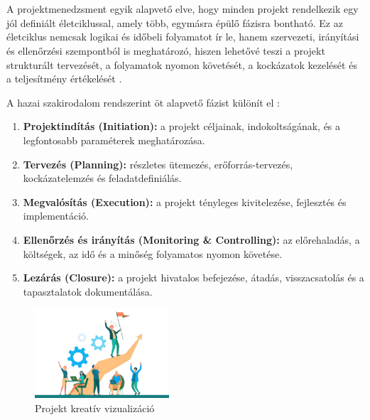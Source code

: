 \chapter{\projectlifecycle}

A projektmenedzsment egyik alapvető elve, hogy minden projekt rendelkezik egy jól definiált életciklussal, 
amely több, egymásra épülő fázisra bontható. 
Ez az életciklus nemcsak logikai és időbeli folyamatot ír le, hanem szervezeti, irányítási és ellenőrzési szempontból is meghatározó, 
hiszen lehetővé teszi a projekt strukturált tervezését, a folyamatok nyomon követését, a kockázatok kezelését és a teljesítmény értékelését \cite{Szalay2018,Hajdu2014,Kaposi2019}. 

A hazai szakirodalom rendszerint öt alapvető fázist különít el \cite{Kovacs2016,Simon2015}:

\begin{enumerate}
    \item \textbf{Projektindítás (Initiation):} a projekt céljainak, indokoltságának, és a legfontosabb paraméterek meghatározása.
    \item \textbf{Tervezés (Planning):} részletes ütemezés, erőforrás-tervezés, kockázatelemzés és feladatdefiniálás.
    \item \textbf{Megvalósítás (Execution):} a projekt tényleges kivitelezése, fejlesztés és implementáció.
    \item \textbf{Ellenőrzés és irányítás (Monitoring \& Controlling):} az előrehaladás, a költségek, az idő és a minőség folyamatos nyomon követése.
    \item \textbf{Lezárás (Closure):} a projekt hivatalos befejezése, átadás, visszacsatolás és a tapasztalatok dokumentálása.
\end{enumerate}

\begin{figure}[H]
    \centering
    \includegraphics[width=50mm, keepaspectratio]{figures/project_creative.png}
    \caption{Projekt kreatív vizualizáció}
    \label{fig:project_creative}
\end{figure}

